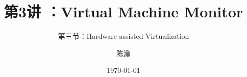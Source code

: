 


\title[第3讲]{第3讲 ：Virtual Machine Monitor} %
\subtitle{第三节：Hardware-assisted Virtualization}
\author{陈渝} %
\date{\today} %




\begin{frame}
\titlepage %
\end{frame}

%
%

